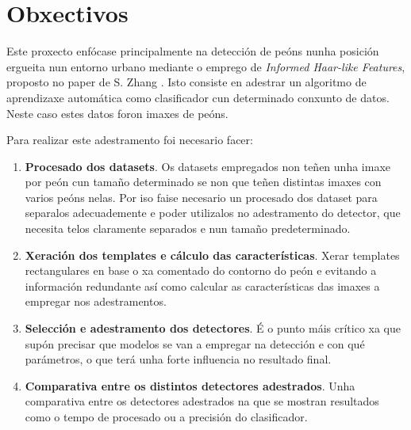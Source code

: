 \documentclass[galician]{./head/uvigo-tfg}
\begin{document}
    \section{Obxectivos}
    Este proxecto enfócase principalmente na detección de peóns nunha posición ergueita nun entorno urbano mediante o emprego de \textit{Informed Haar-like Features}, proposto no paper de S. Zhang \cite{zhang}. Isto consiste en adestrar un algoritmo de aprendizaxe automática como clasificador cun determinado conxunto de datos. Neste caso estes datos foron imaxes de peóns.
    \par Para realizar este adestramento foi necesario facer:
     \begin{enumerate}
     \item \textbf{Procesado dos datasets}. Os datasets empregados non teñen unha imaxe por peón cun tamaño determinado se non que teñen distintas imaxes con varios peóns nelas. Por iso faise necesario un procesado dos dataset para separalos adecuademente e poder utilizalos no adestramento do detector, que necesita telos claramente separados e nun tamaño predeterminado.
     
     \item \textbf{Xeración dos templates e cálculo das características}. Xerar templates rectangulares en base o xa comentado do contorno do peón e evitando a información redundante así como calcular as características das imaxes a empregar nos adestramentos.
     
     \item \textbf{Selección e adestramento dos detectores}. É o punto máis crítico xa que supón precisar que modelos se van a empregar na detección e con qué parámetros, o que terá unha forte influencia no resultado final.
     \item \textbf{Comparativa entre os distintos detectores adestrados}. Unha comparativa entre os detectores adestrados na que se mostran resultados como o tempo de procesado ou a precisión do clasificador.
     \end{enumerate}
     
\end{document}
